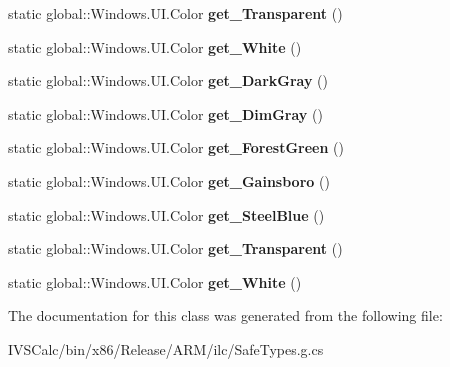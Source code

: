\begin{DoxyCompactItemize}
static global\+::\+Windows.\+U\+I.\+Color {\bfseries get\+\_\+\+Transparent} ()
\item 
\mbox{\label{class_windows_1_1_u_i_1_1_colors_ab982d037d3b9d7bfc8face25899632a5}} 
static global\+::\+Windows.\+U\+I.\+Color {\bfseries get\+\_\+\+White} ()
\item 
\mbox{\label{class_windows_1_1_u_i_1_1_colors_a9d76a878f0f92cd5f0179096a3121e38}} 
static global\+::\+Windows.\+U\+I.\+Color {\bfseries get\+\_\+\+Dark\+Gray} ()
\item 
\mbox{\label{class_windows_1_1_u_i_1_1_colors_a8020ea7c708fb217f08da586815839ed}} 
static global\+::\+Windows.\+U\+I.\+Color {\bfseries get\+\_\+\+Dim\+Gray} ()
\item 
\mbox{\label{class_windows_1_1_u_i_1_1_colors_a6d21c1f503e7529cb0ae4b4ee903d4b8}} 
static global\+::\+Windows.\+U\+I.\+Color {\bfseries get\+\_\+\+Forest\+Green} ()
\item 
\mbox{\label{class_windows_1_1_u_i_1_1_colors_a18d119e8aec87552a69de83aa2a72b80}} 
static global\+::\+Windows.\+U\+I.\+Color {\bfseries get\+\_\+\+Gainsboro} ()
\item 
\mbox{\label{class_windows_1_1_u_i_1_1_colors_a28be7a62a560aed8ceb0a3b42b3b354e}} 
static global\+::\+Windows.\+U\+I.\+Color {\bfseries get\+\_\+\+Steel\+Blue} ()
\item 
\mbox{\label{class_windows_1_1_u_i_1_1_colors_a50578f8d8d64342a2a9d3c21acd8f7a0}} 
static global\+::\+Windows.\+U\+I.\+Color {\bfseries get\+\_\+\+Transparent} ()
\item 
\mbox{\label{class_windows_1_1_u_i_1_1_colors_ab982d037d3b9d7bfc8face25899632a5}} 
static global\+::\+Windows.\+U\+I.\+Color {\bfseries get\+\_\+\+White} ()
\end{DoxyCompactItemize}


The documentation for this class was generated from the following file\+:\begin{DoxyCompactItemize}
\item 
I\+V\+S\+Calc/bin/x86/\+Release/\+A\+R\+M/ilc/Safe\+Types.\+g.\+cs\end{DoxyCompactItemize}
